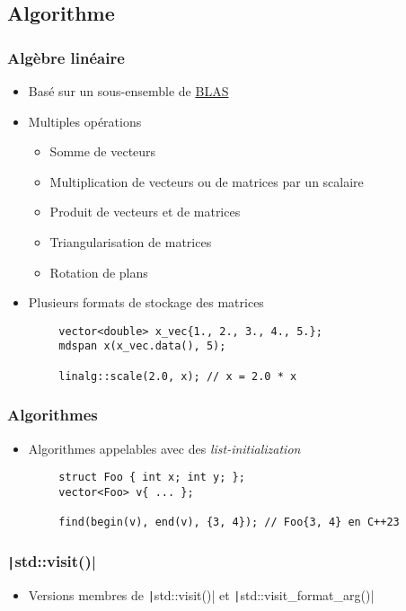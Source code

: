 \documentclass[C++.tex]{subfiles}
\begin{document}
\subsection*{Algorithme}
\begin{frame}[fragile]
	\frametitle{Algèbre linéaire}
	\begin{itemize}
		\item Basé sur un sous-ensemble de \href{https://www.netlib.org/blas/}{BLAS\linklogo}
		\item Multiples opérations
		\begin{itemize}
			\item Somme de vecteurs
			\item Multiplication de vecteurs ou de matrices par un scalaire
			\item Produit de vecteurs et de matrices
			\item Triangularisation de matrices
			\item Rotation de plans
		\end{itemize}
		\item Plusieurs formats de stockage des matrices
	\end{itemize}

	\begin{verbatim}
		vector<double> x_vec{1., 2., 3., 4., 5.};
		mdspan x(x_vec.data(), 5);

		linalg::scale(2.0, x); // x = 2.0 * x
	\end{verbatim}

\end{frame}

\begin{frame}[fragile]
	\frametitle{Algorithmes}
	\begin{itemize}
		\item Algorithmes appelables avec des \textit{list-initialization}
	\end{itemize}

	\begin{verbatim}
		struct Foo { int x; int y; };
		vector<Foo> v{ ... };

		find(begin(v), end(v), {3, 4}); // Foo{3, 4} en C++23
	\end{verbatim}

\end{frame}


\begin{frame}[fragile]
	\frametitle{\texttt|std::visit()|}
	\begin{itemize}
		\item Versions membres de \texttt|std::visit()| et \texttt|std::visit_format_arg()|
	\end{itemize}

\end{frame}
\end{document}
